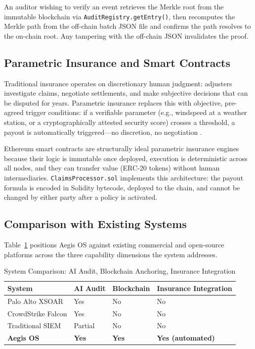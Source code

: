 \documentclass[12pt,a4paper]{article}
\begin{document}
An auditor wishing to verify an event retrieves the Merkle root from the
immutable blockchain via \texttt{AuditRegistry.getEntry()}, then
recomputes the Merkle path from the off-chain batch JSON file and
confirms the path resolves to the on-chain root. Any tampering with the
off-chain JSON invalidates the proof.

\subsection{Parametric Insurance and Smart Contracts}
\label{sec:parametric}

Traditional insurance operates on discretionary human judgment:
adjusters investigate claims, negotiate settlements, and make subjective
decisions that can be disputed for years. Parametric insurance replaces
this with objective, pre-agreed trigger conditions: if a verifiable
parameter (e.g., windspeed at a weather station, or a cryptographically
attested security score) crosses a threshold, a payout is automatically
triggered---no discretion, no negotiation \cite{parametric2022}.

Ethereum smart contracts are structurally ideal parametric insurance
engines because their logic is immutable once deployed, execution is
deterministic across all nodes, and they can transfer value
(ERC-20 tokens) without human intermediaries. \texttt{ClaimsProcessor.sol}
implements this architecture: the payout formula is encoded in
Solidity bytecode, deployed to the chain, and cannot be changed by
either party after a policy is activated.

\subsection{Comparison with Existing Systems}
\label{sec:comparison}

Table~\ref{tab:system-comparison} positions Aegis OS against existing
commercial and open-source platforms across the three capability
dimensions the system addresses.

\begin{table}[ht]
\centering
\caption{System Comparison: AI Audit, Blockchain Anchoring, Insurance Integration}
\label{tab:system-comparison}
\begin{tabular}{@{}llll@{}}
\toprule
\rowcolor{gray!15}
\textbf{System} & \textbf{AI Audit} & \textbf{Blockchain} & \textbf{Insurance Integration} \\
\midrule
Palo Alto XSOAR   & Yes     & No  & No \\
CrowdStrike Falcon & Yes    & No  & No \\
Traditional SIEM  & Partial & No  & No \\
\textbf{Aegis OS} & \textbf{Yes} & \textbf{Yes} & \textbf{Yes (automated)} \\
\bottomrule
\end{tabular}
\end{table}
\end{document}
